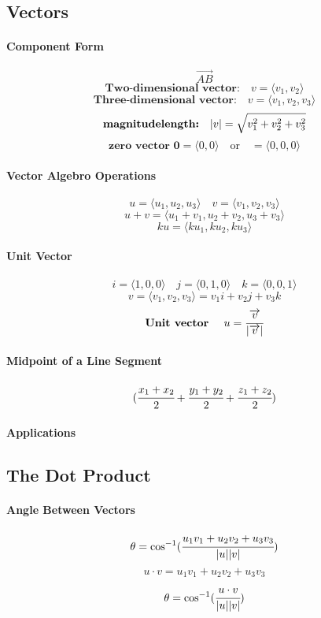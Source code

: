 \documentclass{article}
\begin{document}
        \subsection{Vectors}
            \paragraph{Component Form}
                \[\overrightarrow{AB}\]
                \[\textbf{Two-dimensional vector:}\quad v=\langle v_1,v_2\rangle\]
                \[\textbf{Three-dimensional vector:}\quad v=\langle v_1,v_2,v_3\rangle\]
                \[\textbf{magnitude\\length:}\quad|v|=\sqrt{v_1^2+v_2^2+v_3^2}\]
                \[\textbf{zero vector 0}=\langle 0,0\rangle\quad\text{or}\quad =\langle 0,0,0\rangle\]
            \paragraph{Vector Algebro Operations}
                \[u=\langle u_1,u_2,u_3\rangle\quad v=\langle v_1,v_2,v_3\rangle\]
                \[u+v=\langle u_1+v_1,u_2+v_2,u_3+v_3\rangle\]
                \[ku=\langle ku_1,ku_2,ku_3\rangle\]
            \paragraph{Unit Vector}
                \[i=\langle 1,0,0\rangle\quad j=\langle 0,1,0\rangle\quad k=\langle 0,0,1\rangle\]
                \[v=\langle v_1,v_2,v_3\rangle=v_1i+v_2j+v_3k\]
                \[\textbf{Unit vector }\quad u=\cfrac{\overrightarrow{v}}{|\overrightarrow{v}|}\]
            \paragraph{Midpoint of a Line Segment}
                \[(\cfrac{x_1+x_2}{2}+\cfrac{y_1+y_2}{2}+\cfrac{z_1+z_2}{2})\]
            \paragraph{Applications}
        
        \subsection{The Dot Product}
            \paragraph{Angle Between Vectors}
                \[\theta=\cos^{-1}(\cfrac{u_1v_1+u_2v_2+u_3v_3}{|u||v|})\]
                \[u\cdot v=u_1v_1+u_2v_2+u_3v_3\]
                \[\theta=\cos^{-1}(\cfrac{u\cdot v}{|u||v|})\]
\end{document}
